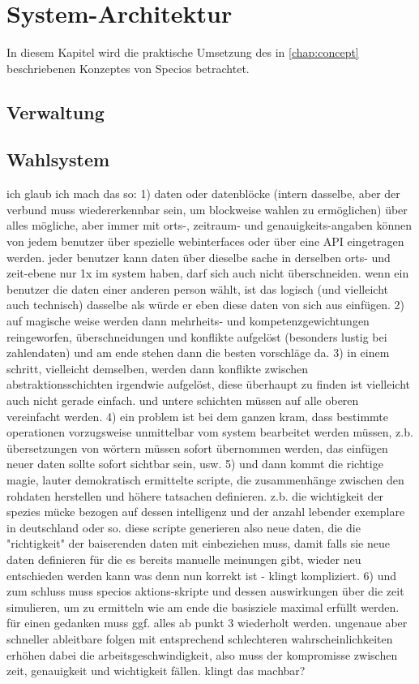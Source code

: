 \chapter{System-Architektur}

In diesem Kapitel wird die praktische Umsetzung des in \vref{chap:concept} beschriebenen Konzeptes von Specios betrachtet.

\section{Verwaltung}

\section{Wahlsystem}

ich glaub ich mach das so:
1) daten oder datenblöcke (intern dasselbe, aber der verbund muss wiedererkennbar sein, um blockweise wahlen zu ermöglichen) über alles mögliche, aber immer mit orts-, zeitraum- und genauigkeits-angaben können von jedem benutzer über spezielle webinterfaces oder über eine API eingetragen werden. jeder benutzer kann daten über dieselbe sache in derselben orts- und zeit-ebene nur 1x im system haben, darf sich auch nicht überschneiden. wenn ein benutzer die daten einer anderen person wählt, ist das logisch (und vielleicht auch technisch) dasselbe als würde er eben diese daten von sich aus einfügen.
2) auf magische weise werden dann mehrheits- und kompetenzgewichtungen reingeworfen, überschneidungen und konflikte aufgelöst (besonders lustig bei zahlendaten) und am ende stehen dann die besten vorschläge da.
3) in einem schritt, vielleicht demselben, werden dann konflikte zwischen abstraktionsschichten irgendwie aufgelöst, diese überhaupt zu finden ist vielleicht auch nicht gerade einfach. und untere schichten müssen auf alle oberen vereinfacht werden.
4) ein problem ist bei dem ganzen kram, dass bestimmte operationen vorzugsweise unmittelbar vom system bearbeitet werden müssen, z.b. übersetzungen von wörtern müssen sofort übernommen werden, das einfügen neuer daten sollte sofort sichtbar sein, usw.
5) und dann kommt die richtige magie, lauter demokratisch ermittelte scripte, die zusammenhänge zwischen den rohdaten herstellen und höhere tatsachen definieren. z.b. die wichtigkeit der spezies mücke bezogen auf dessen intelligenz und der anzahl lebender exemplare in deutschland oder so. diese scripte generieren also neue daten, die die "richtigkeit" der baiserenden daten mit einbeziehen muss, damit falls sie neue daten definieren für die es bereits manuelle meinungen gibt, wieder neu entschieden werden kann was denn nun korrekt ist - klingt kompliziert.
6) und zum schluss muss specios aktions-skripte und dessen auswirkungen über die zeit simulieren, um zu ermitteln wie am ende die basisziele maximal erfüllt werden. für einen gedanken muss ggf. alles ab punkt 3 wiederholt werden. ungenaue aber schneller ableitbare folgen mit entsprechend schlechteren wahrscheinlichkeiten erhöhen dabei die arbeitsgeschwindigkeit, also muss der kompromisse zwischen zeit, genauigkeit und wichtigkeit fällen.
klingt das machbar?

